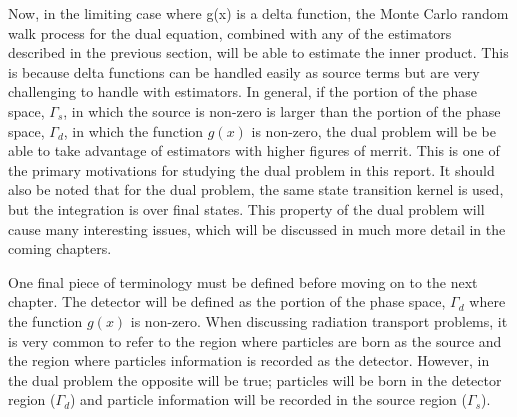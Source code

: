 Now, in the limiting case where g(x) is a delta function, the Monte Carlo
random walk process for the dual equation, combined with any of the estimators 
described in the previous section, will be able to estimate the inner product. 
This is because delta functions can be handled easily as source terms but
are very challenging to handle with estimators. In general, if the portion of 
the phase space, $\Gamma_s$, in which the source is non-zero is larger than the
portion of the phase space, $\Gamma_d$, in which the function $g(x)$ is 
non-zero, the dual problem will be be able to take advantage of estimators with
higher figures of merrit. This is one of the primary motivations for studying 
the dual problem in this report. It should also be noted that for the dual 
problem, the same state transition kernel is used, but the integration is over 
final states. This property of the dual problem will cause many interesting 
issues, which will be discussed in much more detail in the coming chapters.

One final piece of terminology must be defined before moving on to the next 
chapter. The detector will be defined as the portion of the phase space,
$\Gamma_d$ where the function $g(x)$ is non-zero. When discussing radiation 
transport problems, it is very common to refer to the region where particles 
are born as the source and the region where particles information is recorded 
as the detector. However, in the dual problem the opposite will be true; 
particles will be born in the detector region ($\Gamma_d$) and 
particle information will be recorded in the source region ($\Gamma_s$).
